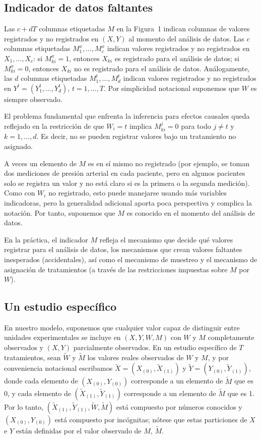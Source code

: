 \documentclass[12pt,a4paper]{article}
\begin{document}
\subsection{Indicador de datos faltantes}

Las $c + dT$ columnas etiquetadas $M$ en la Figura~1 indican columnas de valores
registrados y no registrados en $(X, Y)$ al momento del análisis de datos. Las $c$
columnas etiquetadas $M^x_1, \ldots, M^x_c$ indican valores registrados y no registrados
en $X_1, \ldots, X_c$: si $M^x_{ki} = 1$, entonces $X_{ki}$ es registrado para el
análisis de datos; si $M^x_{ki} = 0$, entonces $X_{ki}$ no es registrado para el análisis
de datos. Análogamente, las $d$ columnas etiquetadas $M^t_1, \ldots, M^t_d$ indican
valores registrados y no registrados en $Y^t = (Y^t_1, \ldots, Y^t_d)$, $t = 1,\ldots,T$.
Por simplicidad notacional suponemos que $W$ es siempre observado.

El problema fundamental que enfrenta la inferencia para efectos causales queda reflejado
en la restricción de que $W_i = t$ implica $M^j_{ki} = 0$ para todo $j \ne t$ y
$k = 1, \ldots, d$. Es decir, no se pueden registrar valores bajo un tratamiento no
asignado.

A veces un elemento de $M$ es en sí mismo no registrado (por ejemplo, se toman dos
mediciones de presión arterial en cada paciente, pero en algunos pacientes solo se registra
un valor y no está claro si es la primera o la segunda medición). Como con $W_i$ no
registrado, esto puede manejarse usando más variables indicadoras, pero la generalidad
adicional aporta poca perspectiva y complica la notación. Por tanto, suponemos que $M$ es
conocido en el momento del análisis de datos.

En la práctica, el indicador $M$ refleja el mecanismo que decide qué valores registrar
para el análisis de datos, los mecanismos que crean valores faltantes inesperados
(accidentales), así como el mecanismo de muestreo y el mecanismo de asignación de
tratamientos (a través de las restricciones impuestas sobre $M$ por $W$).

\subsection{Un estudio específico}

En nuestro modelo, suponemos que cualquier valor capaz de distinguir entre unidades experimentales se incluye en $(X, Y, W, M)$ con $W$ y $M$ completamente observados y $(X, Y)$ parcialmente observados. En un estudio específico de $T$ tratamientos, sean $\tilde{W}$ y $\tilde{M}$ los valores reales observados de $W$ y $M$, y por conveniencia notacional escribamos $\tilde{X} = (X_{(0)}, \tilde{X}_{(1)})$ y $\tilde{Y} = (Y_{(0)}, \tilde{Y}_{(1)})$, donde cada elemento de $(X_{(0)}, Y_{(0)})$ corresponde a un elemento de $\tilde{M}$ que es 0, y cada elemento de $(\tilde{X}_{(1)}, \tilde{Y}_{(1)})$ corresponde a un elemento de $\tilde{M}$ que es 1. Por lo tanto, $(\tilde{X}_{(1)}, \tilde{Y}_{(1)}, \tilde{W}, \tilde{M})$ está compuesto por números conocidos y $(X_{(0)}, Y_{(0)})$ está compuesto por incógnitas; nótese que estas particiones de $X$ e $Y$ están definidas por el valor observado de $M$, $\tilde{M}$.
\end{document}

